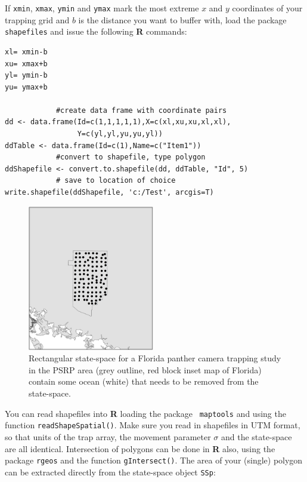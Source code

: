 If \mbox{\tt xmin}, \mbox{\tt xmax}, \mbox{\tt ymin} and 
\mbox{\tt ymax} mark the most extreme
$x$ and $y$ coordinates of your 
trapping grid and $b$ is the distance you want to buffer with, load the 
package \mbox{\tt shapefiles} \citep{stabler:2006} and issue the following
{\bf R} commands:
\begin{verbatim}
xl= xmin-b
xu= xmax+b
yl= ymin-b
yu= ymax+b

            #create data frame with coordinate pairs
dd <- data.frame(Id=c(1,1,1,1,1),X=c(xl,xu,xu,xl,xl), 
				 Y=c(yl,yl,yu,yu,yl)) 
ddTable <- data.frame(Id=c(1),Name=c("Item1"))
            #convert to shapefile, type polygon
ddShapefile <- convert.to.shapefile(dd, ddTable, "Id", 5) 
            # save to location of choice
write.shapefile(ddShapefile, 'c:/Test', arcgis=T) 
\end{verbatim}


\begin{figure}
\begin{center}
\includegraphics[height=2.5in]{Ch7/figs/panthercamera}
\end{center}
\caption{Rectangular state-space for a Florida panther camera trapping
study in the PSRP area (grey outline, red block inset map of Florida)
contain some ocean (white) that needs to be removed from the state-space.}
\label{mcmc.fig.pantercamera}
\end{figure}

You can read shapefiles into {\bf R} loading the package \mbox{\tt 
maptools}
\citep{lewin-koh_etal:2011} and using the function
\verb#readShapeSpatial()#. Make sure you read in shapefiles in UTM format, so
that units of the trap array, the movement parameter $\sigma$ and the
state-space are all identical.  Intersection of polygons can be done
in {\bf R} also, using the package \mbox{\tt rgeos} 
\citep{bivand_rundel:2011} and the
function \verb#gIntersect()#. The area of your (single) polygon can be
extracted directly from the state-space object \mbox{\tt SSp}:

